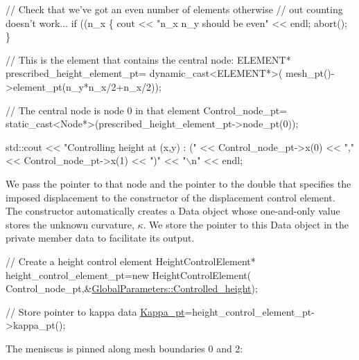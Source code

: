 \begin{DoxyCodeInclude}


 \textcolor{comment}{// Check that we've got an even number of elements otherwise}
 \textcolor{comment}{// out counting doesn't work...}
 \textcolor{keywordflow}{if} ((n\_x%
  \{
   cout << \textcolor{stringliteral}{"n\_x n\_y should be even"} << endl;
   abort();
  \}
  
 \textcolor{comment}{//  This is the element that contains the central node:}
 ELEMENT* prescribed\_height\_element\_pt= \textcolor{keyword}{dynamic\_cast<}ELEMENT*\textcolor{keyword}{>}(
  mesh\_pt()->element\_pt(n\_y*n\_x/2+n\_x/2));
 
 \textcolor{comment}{// The central node is node 0 in that element}
 Control\_node\_pt= \textcolor{keyword}{static\_cast<}Node*\textcolor{keyword}{>}(prescribed\_height\_element\_pt->node\_pt(0));

 std::cout << \textcolor{stringliteral}{"Controlling height at (x,y) : ("} << Control\_node\_pt->x(0) 
           << \textcolor{stringliteral}{","} << Control\_node\_pt->x(1)  << \textcolor{stringliteral}{")"} << \textcolor{stringliteral}{"\(\backslash\)n"} << endl;

\end{DoxyCodeInclude}


We pass the pointer to that node and the pointer to the double that specifies the imposed displacement to the constructor of the displacement control element. The constructor automatically creates a {\ttfamily Data} object whose one-\/and-\/only value stores the unknown curvature, $ \kappa. $ We store the pointer to this {\ttfamily Data} object in the private member data to facilitate its output.


\begin{DoxyCodeInclude}


 \textcolor{comment}{// Create a height control element}
 HeightControlElement* height\_control\_element\_pt=\textcolor{keyword}{new} HeightControlElement(
  Control\_node\_pt,&\hyperlink{namespaceGlobalParameters_a3731f24a02ce4f306d65a9a488f85c96}{GlobalParameters::Controlled\_height});
 
 \textcolor{comment}{// Store pointer to kappa data}
 \hyperlink{namespaceGlobalParameters_ac6234184cce40ab2c6bec92b37e4ae41}{Kappa\_pt}=height\_control\_element\_pt->kappa\_pt();

\end{DoxyCodeInclude}


The meniscus is pinned along mesh boundaries 0 and 2\+:


